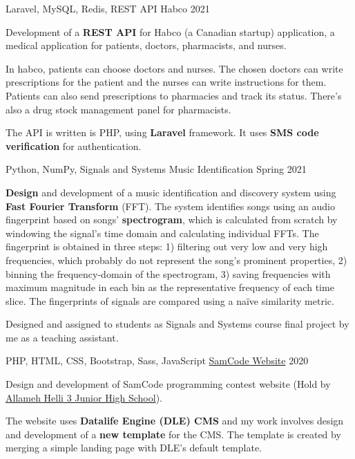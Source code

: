 \begin{cventries}
  \cventry
    {Laravel, MySQL, Redis, REST API} %
    {Habco} %
    {} %
    {2021} %
    {
      \begin{cvitems} %
      	\item {Development of a \textbf{REST API} for Habco (a Canadian startup) application, a medical application for patients, doctors, pharmacists, and nurses.}
      	\item {In habco, patients can choose doctors and nurses. The chosen doctors can write prescriptions for the patient and the nurses can write instructions for them. Patients can also send prescriptions to pharmacies and track its status. There's also a drug stock management panel for pharmacists.}
      	\item {The API is written is PHP, using \textbf{Laravel} framework. It uses \textbf{SMS code verification} for authentication.}
      \end{cvitems}
    }

  \cventry
    {Python, NumPy, Signals and Systems} %
    {Music Identification} %
    {} %
    {Spring 2021} %
    {
      \begin{cvitems} %
      	\item {\textbf{Design} and development of a music identification and discovery system using \textbf{Fast Fourier Transform} (FFT). The system identifies songs using an audio fingerprint based on songs' \textbf{spectrogram}, which is calculated from scratch by windowing the signal's time domain and calculating individual FFTs. The fingerprint is obtained in three steps: 1) filtering out very low and very high frequencies, which probably do not represent the song's prominent properties, 2) binning the frequency-domain of the spectrogram, 3) saving frequencies with maximum magnitude in each bin as the representative frequency of each time slice. The fingerprints of signals are compared using a naïve similarity metric.}
        \item {Designed and assigned to students as Signals and Systems course final project by me as a teaching assistant.}
      \end{cvitems}
    }

  \cventry
    {PHP, HTML, CSS, Bootstrap, Sass, JavaScript} %
    {\href{https://samcode.allamehelli3.ir/}{SamCode Website}} %
    {} %
    {2020} %
    {
      \begin{cvitems} %
      	\item {Design and development of SamCode programming contest website (Hold by \href{http://helli3school.ir}{Allameh Helli 3 Junior High School}).}
      	\item {The website uses \textbf{Datalife Engine (DLE) CMS} and my work involves design and development of a \textbf{new template} for the CMS. The template is created by merging a simple landing page with DLE's default template.}
      \end{cvitems}
    }


\end{cventries}
